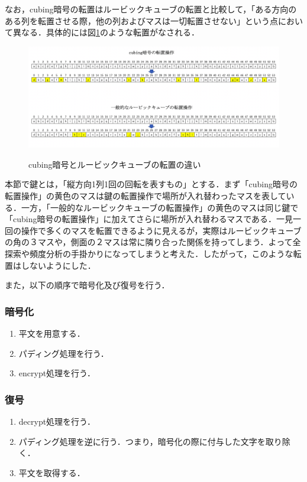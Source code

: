 \documentclass[a4j,titlepage]{jsarticle}
\begin{document}
なお，cubing暗号の転置はルービックキューブの転置と比較して，「ある方向のある列を転置させる際，他の列およびマスは一切転置させない」という点において異なる．具体的には図\ref{fig:trans-diff}のような転置がなされる．
\begin{figure}[htb]
  \includegraphics[width=12cm]{./tex_pic/trans.png}\\
  \caption{cubing暗号とルービックキューブの転置の違い}
  \label{fig:trans-diff}
\end{figure}
本節で鍵とは，「縦方向1列1回の回転を表すもの」とする．まず「cubing暗号の転置操作」の黄色のマスは鍵の転置操作で場所が入れ替わったマスを表している．一方，「一般的なルービックキューブの転置操作」の黄色のマスは同じ鍵で「cubing暗号の転置操作」に加えてさらに場所が入れ替わるマスである．一見一回の操作で多くのマスを転置できるように見えるが，実際はルービックキューブの角の３マスや，側面の２マスは常に隣り合った関係を持ってしまう．よって全探索や頻度分析の手掛かりになってしまうと考えた．したがって，このような転置はしないようにした．

また，以下の順序で暗号化及び復号を行う．
\subsubsection{暗号化}
\begin{screen}
  \begin{enumerate}
    \item 平文を用意する．
    \item パディング処理を行う．
    \item encrypt処理を行う．
  \end{enumerate}
\end{screen}

\subsubsection{復号}
\begin{screen}
  \begin{enumerate}
    \item decrypt処理を行う．
    \item パディング処理を逆に行う．つまり，暗号化の際に付与した文字を取り除く．
    \item 平文を取得する．
  \end{enumerate}
\end{screen}
\end{document}
